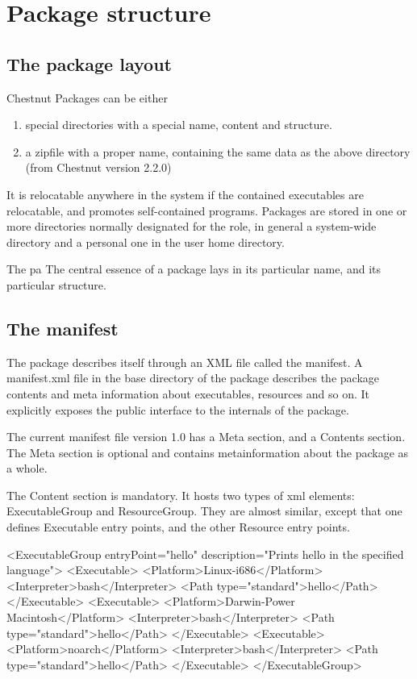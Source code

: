 \section{Package structure}

\subsection{The package layout}

Chestnut Packages can be either 
\begin{enumerate}
\item special directories with a special name, content and structure.
\item a zipfile with a proper name, containing the same data as the above directory (from Chestnut version 2.2.0) 
\end{enumerate}

It is relocatable anywhere
in the system if the contained executables are relocatable, and promotes
self-contained programs. Packages are stored in one or more directories 
normally designated for the role, in general a system-wide directory and a
personal one in the user home directory. 

The pa
The central essence of a package lays in its particular name, and its particular structure.

\subsection{The manifest}
The package describes itself through an XML file called the manifest.
A manifest.xml file in the base directory of the package describes the package
contents and meta information about executables, resources and so on. It
explicitly exposes the public interface to the internals of the package.

The current manifest file version 1.0 has a Meta section, and a Contents section. 
The Meta section is optional and contains metainformation about the package as a whole.

The Content section is mandatory. It hosts two types of xml elements:
ExecutableGroup and ResourceGroup.  They are almost similar, except that one
defines Executable entry points, and the other Resource entry points.

        <ExecutableGroup entryPoint="hello" description="Prints hello in the specified language">
            <Executable>
                <Platform>Linux-i686</Platform>
                <Interpreter>bash</Interpreter>
                <Path type="standard">hello</Path>
            </Executable>
            <Executable>
                <Platform>Darwin-Power Macintosh</Platform>
                <Interpreter>bash</Interpreter>
                <Path type="standard">hello</Path>
            </Executable>
            <Executable>
                <Platform>noarch</Platform>
                <Interpreter>bash</Interpreter>
                <Path type="standard">hello</Path>
            </Executable>
        </ExecutableGroup>

